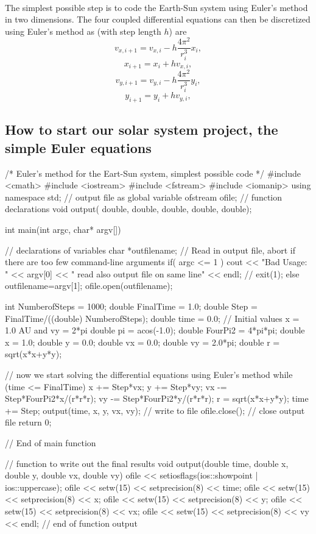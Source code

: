 \documentclass[%
oneside,                 %
final,                   %
10pt]{article}
\begin{document}
\paragraph{}

The simplest possible step is to code the Earth-Sun system using Euler's method in two dimensions.
The four coupled differential equations can then be discretized using Euler's method as (with step length $h$) are
\[
   v_{x,i+1}=v_{x,i}-h\frac{4\pi^2}{r_i^3}x_i,
\]
\[
   x_{i+1}=x_i+hv_{x,i},
\]
\[
   v_{y,i+1}=v_{y,i}-h\frac{4\pi^2}{r_i^3}y_i,
\]
\[
   y_{i+1}=y_i+hv_{y,i},
\]




\subsection{How to start our solar system project, the simple Euler equations}
\bcppcod
/*    
    Euler's method for the Eart-Sun system, simplest possible code
*/ 
#include <cmath>
#include <iostream>
#include <fstream>
#include <iomanip>
using namespace  std;
// output file as global variable
ofstream ofile;
// function declarations
void output( double, double, double, double, double);

int main(int argc, char* argv[])
{
//  declarations of variables
  char *outfilename;
  // Read in output file, abort if there are too few command-line arguments
  if( argc <= 1 ){
    cout << "Bad Usage: " << argv[0] <<
      " read also output file on same line" << endl;
    //    exit(1);
  }
  else{
    outfilename=argv[1];
  }
  ofile.open(outfilename);

  int NumberofSteps = 1000;
  double FinalTime = 1.0;
  double Step = FinalTime/((double) NumberofSteps);
  double time = 0.0;
  // Initial values  x = 1.0 AU and vy = 2*pi
  double pi = acos(-1.0);
  double FourPi2 = 4*pi*pi;
  double x =  1.0; double y =  0.0; double vx = 0.0; double vy = 2.0*pi;
  double r = sqrt(x*x+y*y);

// now we start solving the differential equations using Euler's method
  while (time <= FinalTime){
    x += Step*vx;
    y += Step*vy;
    vx -= Step*FourPi2*x/(r*r*r);
    vy -= Step*FourPi2*y/(r*r*r);
    r = sqrt(x*x+y*y);
    time += Step;
    output(time, x, y, vx, vy);   // write to file 
  }
  ofile.close();  // close output file
  return 0;
}   //  End of main function 

//    function to write out the final results
void output(double time, double x, double y, double vx, double vy)
{
  ofile << setiosflags(ios::showpoint | ios::uppercase);
  ofile << setw(15) << setprecision(8) << time;
  ofile << setw(15) << setprecision(8) << x;
  ofile << setw(15) << setprecision(8) << y;
  ofile << setw(15) << setprecision(8) << vx;
  ofile << setw(15) << setprecision(8) << vy << endl;
}  // end of function output
\end{document}
